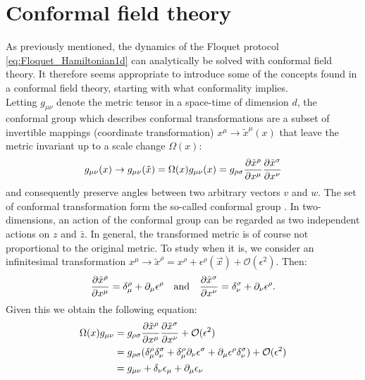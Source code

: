 \documentclass[11pt, a4paper, oneside]{book}
\theoremstyle{definition} %
\begin{document}
	
\section{Conformal field theory}
As previously mentioned, the dynamics of the Floquet protocol \ref{eq:Floquet_Hamiltonian1d} can analytically be solved with conformal field theory. It therefore seems appropriate to introduce some of the concepts found in a conformal field theory, starting with what conformality implies. \\

Letting $g_{\mu \nu}$ denote the metric tensor in a space-time of dimension $d$, the conformal group which describes conformal transformations are a subset of invertible mappings (coordinate transformation) $x^\mu \rightarrow \tilde{x}^\mu(x)$ that leave the metric invariant up to a scale change $\Omega(x)$:
\begin{equation}
g_{\mu \nu}(x) \rightarrow g_{\mu \nu}(\tilde{x}) = \Omega(x) g_{\mu \nu}(x)
= g_{\rho \sigma} \pdv{\tilde{x}^\rho}{x^\mu}\pdv{\tilde{x}^\sigma}{x^\nu}
\label{conformal_transformation} 
\end{equation}
and consequently preserve angles between two arbitrary vectors $v$ and $w$. The set of conformal transformation form the so-called conformal group \cite{Ginsparg}. In two-dimensions, an action of the conformal group can be regarded as two independent actions on $z$ and $\bar{z}$. In general, the transformed metric is of course not proportional to the original metric. To study when it is, we consider an infinitesimal transformation $x^\mu \rightarrow \tilde{x}^\rho = x^\rho + \epsilon^\rho(\vec{x}) + \mathcal{O}(\epsilon^2)$. Then:
\begin{equation}
	\pdv{\tilde{x}^\rho}{x^\mu} = \delta_{\mu}^\rho + \partial_\mu \epsilon^\rho \qq{and} \pdv{\tilde{x}^\sigma}{x^\nu} = \delta_{\nu}^\sigma + \partial_\nu \epsilon^\rho .
\end{equation}
Given this we obtain the following equation:
\begin{align}
	\Omega(x)g_{\mu \nu} &= g_{\rho \sigma} \pdv{\tilde{x}^\rho}{x^\mu}\pdv{\tilde{x}^\sigma}{x^\nu} + \mathcal{O}(\epsilon^2) \\
	&=g_{\rho \sigma}(\delta_{\mu}^\rho \delta_{\nu}^\sigma + \delta_{\mu}^\rho \partial_\nu \epsilon^\sigma + \partial_\mu \epsilon^\rho \delta_\nu^\sigma) + \mathcal{O}(\epsilon^2) \\
	&=g_{\mu \nu} + \delta_\nu \epsilon_\mu + \partial_\mu \epsilon_\nu
\end{align}
\end{document}
